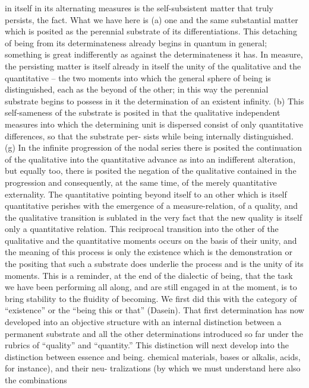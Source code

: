 in itself in its alternating measures is the self-subsistent matter that truly
persists, the fact.
What we have here is (a) one and the same substantial matter which
is posited as the perennial substrate of its differentiations. This detaching
of being from its determinateness already begins in quantum in general;
something is great indifferently as against the determinateness it has. In
measure, the persisting matter is itself already in itself the unity of the
qualitative and the quantitative – the two moments into which the general
sphere of being is distinguished, each as the beyond of the other; in this
way the perennial substrate begins to possess in it the determination of an
existent infinity. (b) This self-sameness of the substrate is posited in that
the qualitative independent measures into which the determining unit is
dispersed consist of only quantitative differences, so that the substrate per-
sists while being internally distinguished. (g) In the infinite progression of
the nodal series there is posited the continuation of the qualitative into the
quantitative advance as into an indifferent alteration, but equally too, there
is posited the negation of the qualitative contained in the progression and
consequently, at the same time, of the merely quantitative externality. The
quantitative pointing beyond itself to an other which is itself quantitative
perishes with the emergence of a measure-relation, of a quality, and the
qualitative transition is sublated in the very fact that the new quality is
itself only a quantitative relation. This reciprocal transition into the other
of the qualitative and the quantitative moments occurs on the basis of their
unity, and the meaning of this process is only the existence which is the
demonstration or the positing that such a substrate does underlie the process
and is the unity of its moments.
This is a reminder, at the end of the dialectic of being, that the task we have been performing all
along, and are still engaged in at the moment, is to bring stability to the fluidity of becoming.
We first did this with the category of “existence” or the “being this or that” (Dasein). That first
determination has now developed into an objective structure with an internal distinction between
a permanent substrate and all the other determinations introduced so far under the rubrics of
“quality” and “quantity.” This distinction will next develop into the distinction between essence
and being.
chemical materials, bases or alkalis, acids, for instance), and their neu-
tralizations (by which we must understand here also the combinations

